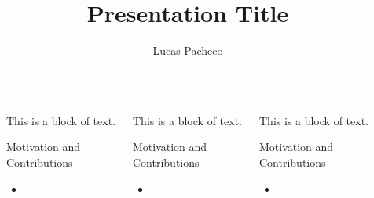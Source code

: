 \documentclass[final]{beamer}
\title{Presentation Title}
\author{Lucas Pacheco\inst{1}}
\institute[shortinst]{\inst{1} University of Bern}
\newlength{\sepwidth}
\newlength{\colwidth}
\newcommand{\separatorcolumn}{\begin{column}{\sepwidth}\end{column}}
\begin{document}
\begin{frame}[t]
\begin{columns}[t]
\separatorcolumn

\begin{column}{\colwidth}

\begin{block}{This is a block of text.}
\end{block}

\begin{block}{Motivation and Contributions}

\begin{itemize}
    \item 
\end{itemize}






\end{block}
\end{column}

\begin{column}{\colwidth}

\begin{block}{This is a block of text.}
\end{block}

\begin{block}{Motivation and Contributions}

\begin{itemize}
    \item 
\end{itemize}

\end{block}
\end{column}


\begin{column}{\colwidth}

\begin{block}{This is a block of text.}
\end{block}

\begin{block}{Motivation and Contributions}

\begin{itemize}
    \item 
\end{itemize}

\end{block}
\end{column}


\separatorcolumn
\end{columns}
\end{frame}
\end{document}
